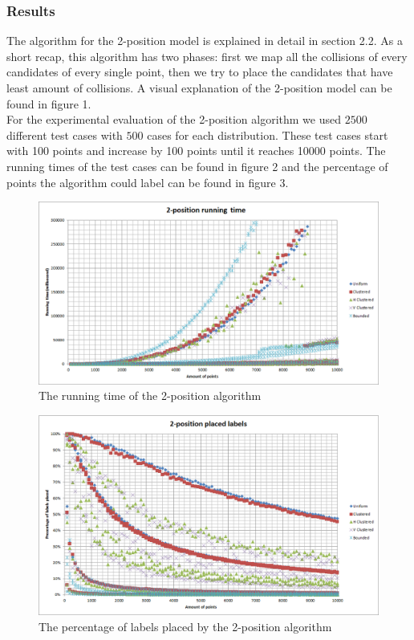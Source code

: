 \documentclass[crop=false,a4paper,oneside,11pt]{standalone}
\begin{document}
\subsubsection{Results}
The algorithm for the 2-position model is explained in detail in section 2.2. As a short recap, this algorithm has two phases: first we map all the collisions of every candidates of every single point, then we try to place the candidates that have least amount of collisions. A visual explanation of the 2-position model can be found in figure 1.\\
For the experimental evaluation of the 2-position algorithm we used $2500$ different test cases with $500$ cases for each distribution. These test cases start with 100 points and increase by 100 points until it reaches 10000 points. The running times of the test cases can be found in figure 2 and the percentage of points the algorithm could label can be found in figure 3.\\

\begin{figure}[H]
 \centering
  \centerline{\includegraphics[scale = 0.5]{2PosRunningTime.png}}
  \caption{The running time of the 2-position algorithm}
 \end{figure}

\begin{figure}[H]
 \centering
  \centerline{\includegraphics[scale = 0.5]{2PosLabelsPlaced.png}}
  \caption{The percentage of labels placed by the 2-position algorithm}
 \end{figure}
\end{document}
